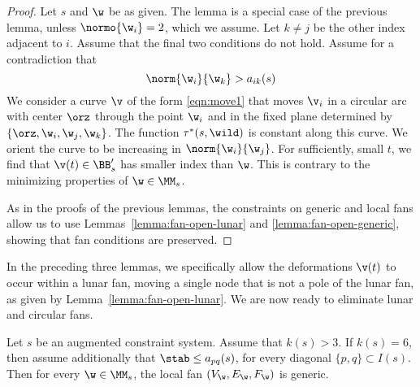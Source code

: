 \begin{proof} 
Let $s$ and $\w$ be as given.  The lemma is a special
case of the previous lemma, unless $\normo{\w_i}=2$, which we assume.
Let $k\ne j$ be the other index adjacent to $i$.
Assume that the final
two conditions do not hold.
Assume for a contradiction that 
\[
\norm{\w_i}{\w_k}>a_{i k}(s)
\]
We consider a curve $\v$ of the form \eqref{eqn:move1} that moves $\v_i$
in a circular arc with center $\orz$ through the point $\w_i$ and in
the fixed plane determined by $\{\orz,\w_i,\w_j,\w_{k}\}$.  
The function $\tau^*(s,\wild)$ is
constant along this curve.  We orient the curve to be increasing
in $\norm{\w_i}{\w_{j}}$.  For sufficiently, small $t$, we find that
$\v(t)\in\BB'_s$ has smaller index than $\w$.  This is contrary to the minimizing
properties of $\w\in\MM_s$.

As in the proofs of the previous lemmas, the constraints on generic and local fans
allow us to use Lemmas~\ref{lemma:fan-open-lunar} and
\ref{lemma:fan-open-generic}, showing that fan conditions are preserved.
\end{proof}

In the preceding three lemmas, we specifically allow the deformations
$\v(t)$ to occur within a lunar fan, moving a single node that is not a pole
of the lunar fan, as given by Lemma~\ref{lemma:fan-open-lunar}.
We are now ready to eliminate  lunar and circular
fans.

\begin{lemma}\label{lemma:bjo} 
Let $s$ be an augmented constraint system.
Assume that $k(s)>3$.
If $k(s)=6$, then assume additionally that
$\stab\le a_{pq}(s)$, for every diagonal $\{p,q\}\subset I(s)$.
Then for every  $\w\in\MM_s$,  the local fan $(V_\w,E_\w,F_\w)$ is generic.
\end{lemma}

